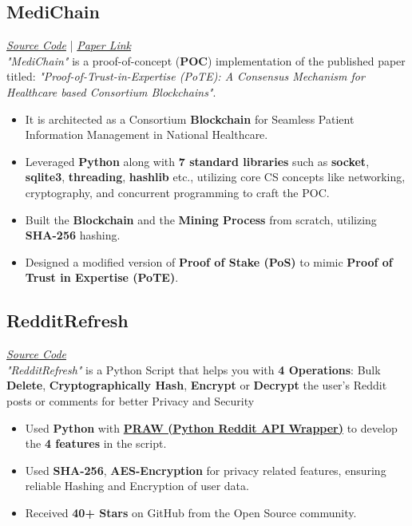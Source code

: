 \documentclass[a4paper,12pt]{article}
\newcommand{\praw}{\href{https://github.com/praw-dev/praw}{PRAW (Python Reddit API Wrapper)}}
\begin{document}
\subsection*{MediChain} \textit{\href{https://github.com/karan51ngh/MediChain}{Source Code}} | \textit{\href{https://papers.ssrn.com/sol3/papers.cfm?abstract_id=4804243}{Paper Link}} \\
\textit{"MediChain"} is a proof-of-concept (\textbf{POC}) implementation of the published paper titled: \textit{"Proof-of-Trust-in-Expertise (PoTE): A Consensus Mechanism for Healthcare based Consortium Blockchains"}.
\begin{itemize}[leftmargin=1.5em]
    \item It is architected as a Consortium \textbf{Blockchain} for Seamless Patient Information Management in National Healthcare.
    \item Leveraged \textbf{Python} along with \textbf{7 standard libraries} such as \textbf{socket}, \textbf{sqlite3}, \textbf{threading}, \textbf{hashlib} etc., utilizing core CS concepts like networking, cryptography, and concurrent programming to craft the POC.
    \item Built the \textbf{Blockchain} and the \textbf{Mining Process} from scratch, utilizing \textbf{SHA-256} hashing.
    \item Designed a modified version of \textbf{Proof of Stake (PoS)} to mimic \textbf{Proof of Trust in Expertise (PoTE)}.
\end{itemize}
\subsection*{RedditRefresh} \textit{\href{https://github.com/karan51ngh/RedditRefresh}{Source Code}} \\
\textit{"RedditRefresh"} is a Python Script that helps you with \textbf{4 Operations}: Bulk \textbf{Delete}, \textbf{Cryptographically Hash}, \textbf{Encrypt} or \textbf{Decrypt} the user's Reddit posts or comments for better Privacy and Security
\begin{itemize}[leftmargin=1.5em]
    \item Used \textbf{Python} with \textbf{\praw} to develop the \textbf{4 features} in the script.
    \item Used \textbf{SHA-256}, \textbf{AES-Encryption} for privacy related features, ensuring reliable Hashing and Encryption of user data.
    \item Received \textbf{40+ Stars} on GitHub from the Open Source community.
\end{itemize}
\end{document}

